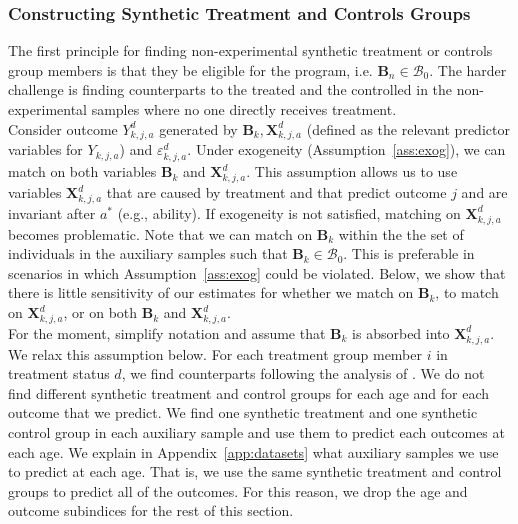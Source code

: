 \subsubsection{Constructing Synthetic Treatment and Controls Groups}\label{appendix:match}

\noindent The first principle for finding non-experimental synthetic treatment or controls group members is that they be eligible for the program, i.e. $\bm{B}_n \in \mathcal{B}_{0}$. The harder challenge is finding counterparts to the treated and the controlled in the non-experimental samples where no one directly receives treatment.\\

\noindent Consider outcome $Y^d_{k,j,a}$ generated by $\bm{B}_k, \bm{X}^d_{k,j,a}$ (defined as the relevant predictor variables for $Y_{k,j,a}$) and $\varepsilon^d_{k,j,a}$. Under exogeneity (Assumption~\ref{ass:exog}), we can match on both variables $\bm{B}_k$ and $\bm{X}^d_{k,j,a}$. This assumption allows us to  use variables $\bm{X}^d_{k,j,a}$ that are caused by treatment and that predict outcome $j$ and are invariant after $a^\ast$ (e.g., ability). If exogeneity is not satisfied, matching on $\bm{X}^d_{k,j,a}$ becomes problematic. Note that we can match on $\bm{B}_k$ within the the set of individuals in the auxiliary samples such that $\bm{B}_k \in \mathcal{B}_{0}$. This is preferable in scenarios in which Assumption~\ref{ass:exog} could be violated. Below, we show that there is little sensitivity of our estimates for whether we match on $\bm{B}_k$, to match on $\bm{X}^d_{k,j,a}$, or on both $\bm{B}_k$ and $\bm{X}^d_{k,j,a}$.\\

\noindent For the moment, simplify notation and assume that $\bm{B}_k$ is absorbed into $\bm{X}^d_{k,j,a}$. We relax this assumption below. For each treatment group member $i$ in treatment status $d$, we find counterparts following the analysis of \citet{Heckman_Ichimura_etal_1998_REStud}. We do not find different synthetic treatment and control groups for each age and for each outcome that we predict. We find one synthetic treatment and one synthetic control group in each auxiliary sample and use them to predict each outcomes at each age. We explain in Appendix~\ref{app:datasets} what auxiliary samples we use to predict at each age. That is, we use the same synthetic treatment and control groups to predict all of the outcomes. For this reason, we drop the age and outcome subindices for the rest of this section.\\

